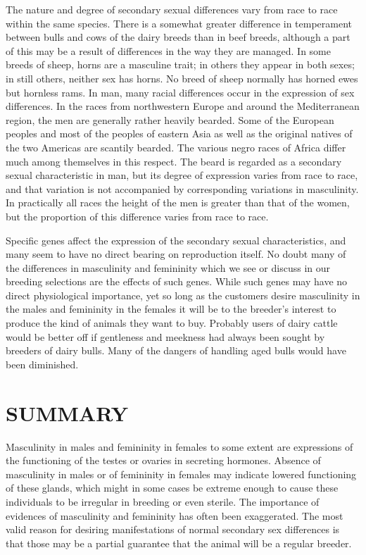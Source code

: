 The nature and degree of secondary sexual differences vary from
race to race within the same species. There is a somewhat greater difference
in temperament between bulls and cows of the dairy breeds than
in beef breeds, although a part of this may be a result of differences in
the way they are managed. In some breeds of sheep, horns are a masculine
trait; in others they appear in both sexes; in still others, neither sex
has horns. No breed of sheep normally has horned ewes but hornless
rams. In man, many racial differences occur in the expression of sex
differences. In the races from northwestern Europe and around the
Mediterranean region, the men are generally rather heavily bearded.
Some of the European peoples and most of the peoples of eastern Asia
as well as the original natives of the two Americas are scantily bearded.
The various negro races of Africa differ much among themselves in this
respect. The beard is regarded as a secondary sexual characteristic in
man, but its degree of expression varies from race to race, and that
variation is not accompanied by corresponding variations in masculinity.
In practically all races the height of the men is greater than that of
the women, but the proportion of this difference varies from race to
race.

Specific genes affect the expression of the secondary sexual characteristics,
and many seem to have no direct bearing on reproduction
itself. No doubt many of the differences in masculinity and femininity
which we see or discuss in our breeding selections are the effects of such
genes. While such genes may have no direct physiological importance,
yet so long as the customers desire masculinity in the males and femininity
in the females it will be to the breeder's interest to produce the
kind of animals they want to buy. Probably users of dairy cattle would
be better off if gentleness and meekness had always been sought by
breeders of dairy bulls. Many of the dangers of handling aged bulls
would have been diminished.

\section*{SUMMARY}

Masculinity in males and femininity in females to some extent are
expressions of the functioning of the testes or ovaries in secreting hormones.
Absence of masculinity in males or of femininity in females may
indicate lowered functioning of these glands, which might in some
cases be extreme enough to cause these individuals to be irregular in
breeding or even sterile. The importance of evidences of masculinity
and femininity has often been exaggerated. The most valid reason for
desiring manifestations of normal secondary sex differences is that those
may be a partial guarantee that the animal will be a regular breeder.

